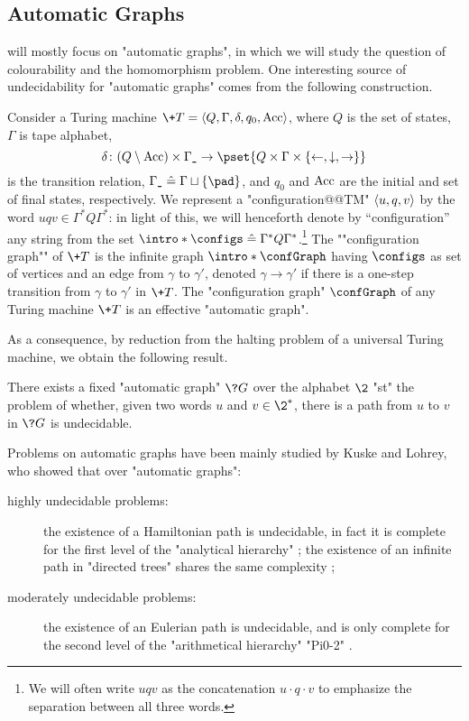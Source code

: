 \subsection{Automatic Graphs}
 will mostly focus on "automatic graphs", in which we will study
the question of colourability and the homomorphism problem.
One interesting source of undecidability for "automatic graphs" comes from the following construction.

\begin{example}
	Consider a Turing machine $\+T = \tup{Q,\Gamma,\delta,q_0,\Acc}$, where $Q$ is the set of states, $\Gamma$ is tape alphabet,
	\[
		\delta\colon (Q \setminus \Acc) \times \Gamma_{\smallpad} \to \pset{Q \times \Gamma \times \set{\leftarrow, \downarrow, \rightarrow}}
	\]
	is the transition relation, $\Gamma_{\smallpad} \defeq \Gamma \dcup \set{\pad}$, and $q_0$ and $\textrm{Acc}$ are the initial and set of final states, respectively.
	We represent a "configuration@@TM" $\langle u, q, v\rangle$ by the word $uqv \in \Gamma^* Q \Gamma^*$:
	in light of this, we will henceforth denote by ``configuration'' any string from the set  \AP$\intro*\configs \defeq  \Gamma^* Q \Gamma^*$.\footnote{We will often write
	$uqv$ as the concatenation $u\cdot q \cdot v$ to emphasize
	the separation between all three words.}
	The \AP""configuration graph"" of $\+T$ is the infinite graph $\intro*\confGraph$ having $\configs$ as set of vertices and an edge from $\gamma$ to $\gamma'$, denoted $\gamma \rightarrow \gamma'$ if there is a one-step transition from $\gamma$ to $\gamma'$ in $\+T$. The "configuration graph" $\confGraph$ of any Turing machine $\+T$ is an effective "automatic graph".
\end{example}

As a consequence, by reduction from the halting problem of a universal Turing machine, 
we obtain the following result.
\begin{proposition}
	There exists a fixed "automatic graph" $\?G$ over the alphabet $\2$ "st"
	the problem of whether, given two words $u$ and $v \in \2^*$, there is a path from
	$u$ to $v$ in $\?G$ is undecidable.
\end{proposition}

Problems on automatic graphs have been mainly studied by Kuske and Lohrey, who showed that over "automatic graphs":
\begin{description}
	\item[highly undecidable problems:] the existence of a Hamiltonian path
		is undecidable, in fact it is complete for the first level of the "analytical hierarchy"
		\cite[Theorem~3.2]{KuskeLohrey2010AutomaticGraphs};
		the existence of an infinite path in "directed trees" shares the same complexity
		\cite[Theorem~3.6]{KuskeLohrey2010AutomaticGraphs};
	\item[moderately undecidable problems:]
		the existence of an Eulerian path is undecidable, and is only complete for
		the second level of the "arithmetical hierarchy" "Pi0-2" \cite[Theorem~4.13]{KuskeLohrey2010AutomaticGraphs}.
\end{description}


